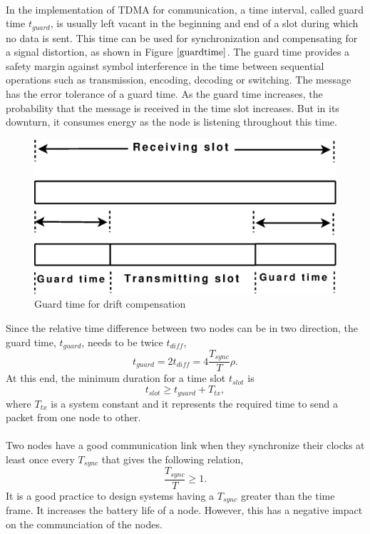 \documentclass[a4paper,10pt]{report}
\begin{document}
\paragraph*{}
In the implementation of TDMA for communication, a time interval, called guard time $t_{guard}$, is usually left vacant in the beginning and end of a slot during which no data is sent. This time can be used for synchronization and compensating for a signal distortion, as shown in Figure $\ref{guardtime}$. The guard time provides a safety margin against symbol interference in the time between sequential operations such as transmission, encoding, decoding or switching. The message has the error tolerance of a guard time. As the guard time increases, the probability that the message is received in the time slot increases. But in its downturn, it consumes energy as the node is listening throughout this time.
\begin{figure}
\centering
\includegraphics[width=0.4 \textwidth]{guardtime}
\caption{Guard time for drift compensation} \label{guardtime}
\end{figure}
Since the relative time difference between two nodes can be in two direction, the guard time, $t_{guard}$, needs to be twice $t_{diff}$,
\begin{equation}
t_{guard}= 2t_{diff} = 4\frac{T_{sync}}{T}\rho.
\end{equation}
At this end, the minimum duration for a time slot $t_{slot}$ is
\begin{equation}
t_{slot} \geq t_{guard} + T_{tx},
\end{equation}
where $T_{tx}$ is a system constant and it represents the required time to send a packet from one node to other.
\paragraph*{} 
Two nodes have a good communication link when they synchronize their clocks at least once every $T_{sync}$ that gives the following
relation,
\begin{equation}
\frac{T_{sync}}{T}\geq 1.
\end{equation}
It is a good practice to design systems having a $T_{sync}$ greater than the time frame. It increases the battery life of a node. However,
this has a negative impact on the communciation of the nodes.
\end{document}

